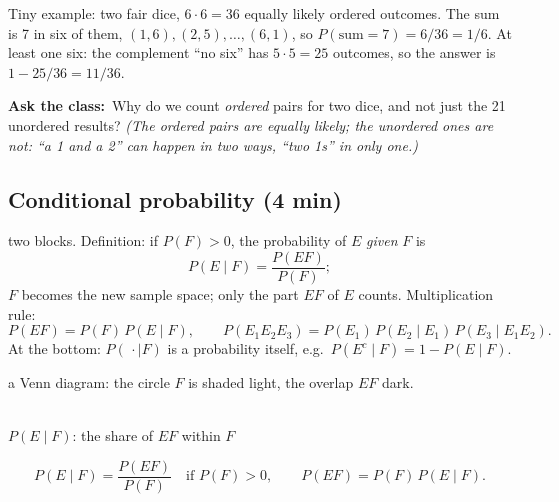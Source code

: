 \documentclass[11pt,a4paper,parskip=half]{scrartcl}
\newcommand{\Om}{\Omega}
\newcommand{\ask}{\textbf{\color{navy}Ask the class:}\ }
\begin{document}
Tiny example: two fair dice, $6\cdot6=36$ equally likely ordered
outcomes. The sum is 7 in six of them, $(1,6),(2,5),\dots,(6,1)$, so
$P(\text{sum}=7)=6/36=1/6$. At least one six: the complement ``no six''
has $5\cdot5=25$ outcomes, so the answer is $1-25/36=11/36$.

\ask Why do we count \emph{ordered} pairs for two dice, and not just the
21 unordered results? \emph{(The ordered pairs are equally likely; the
unordered ones are not: ``a 1 and a 2'' can happen in two ways, ``two
1s'' in only one.)}

\subsection{Conditional probability (4 min)}

\begin{onslide}
	two blocks. Definition: if $P(F)>0$, the probability of $E$
	\emph{given} $F$ is
	\[ P(E\mid F)=\frac{P(EF)}{P(F)}; \]
	$F$ becomes the new sample space; only the part $EF$ of $E$ counts.
	Multiplication rule:
	\[ P(EF)=P(F)\,P(E\mid F),\qquad
		P(E_1E_2E_3)=P(E_1)\,P(E_2\mid E_1)\,P(E_3\mid E_1E_2). \]
	At the bottom: $P(\,\cdot\mid F)$ is a probability itself, e.g.\
	$P(E^c\mid F)=1-P(E\mid F)$.
\end{onslide}

\needspace{0.25\textheight}
\begin{slidefig}
	a Venn diagram: the circle $F$ is shaded light, the overlap $EF$ dark.
	\begin{center}
		\\[1mm]
		\footnotesize $P(E\mid F)$: the share of $EF$ within $F$
	\end{center}
	\begin{printeq}
	\[ P(E\mid F)=\frac{P(EF)}{P(F)}\quad\text{if } P(F)>0,\qquad
		P(EF)=P(F)\,P(E\mid F). \]
	\end{printeq}
\end{slidefig}
\end{document}
